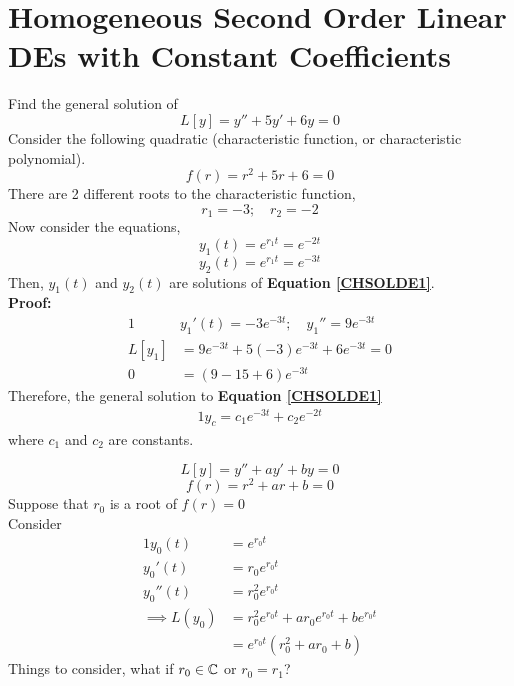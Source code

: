 \documentclass[diffeq.tex]{subfiles}
\begin{document}
\section{Homogeneous Second Order Linear DEs with Constant Coefficients}
\begin{example}[CHSOLDE]
    Find the general solution of
    \begin{equation}
        \label{CHSOLDE1}
        L[y] = y'' + 5y' + 6y = 0
    \end{equation}
    Consider the following quadratic (characteristic function, or characteristic polynomial).
    \begin{equation}
        f(r) = r^{2} + 5r + 6 = 0
    \end{equation}
    There are 2 different roots to the characteristic function,
    \begin{equation}
        r_{1} = -3;\quad r_{2} = -2
    \end{equation}
    Now consider the equations,
    \begin{equation}
        y_{1}(t) = e^{r_{1}t} = e^{-2t}
    \end{equation}
    \begin{equation}
        y_{2}(t) = e^{r_{1}t} = e^{-3t}
    \end{equation}
    Then, $y_{1}(t)$ and $y_{2}(t)$ are solutions of \textbf{Equation \ref{CHSOLDE1}}.\\
    \textbf{Proof:}
    \begin{alignat}{1}
        &y_{1}'(t) = -3e^{-3t};\quad y_{1}'' = 9e^{-3t}\\
        L[y_{1}] &= 9e^{-3t} + 5(-3)e^{-3t} + 6e^{-3t} = 0 \\
        0&= (9 - 15 + 6)e^{-3t}
    \end{alignat}
    Therefore, the general solution to \textbf{Equation \ref{CHSOLDE1}}
    \begin{alignat}{1}
        y_{c} = c_{1}e^{-3t} + c_{2}e^{-2t}
    \end{alignat}
    where $c_1$ and $c_2$ are constants.
\end{example}
\np
\begin{example}
    \begin{equation}
        L[y] = y'' + ay' + by = 0
    \end{equation}
    \begin{equation}
        f(r) = r^{2} + ar + b = 0
    \end{equation}
    Suppose that $r_{0}$ is a root of $f(r) = 0$\\
    Consider \begin{alignat}{1}
        y_{0}(t) &= e^{r_{0}t}\\
        y_{0}'(t) &= r_{0}e^{r_{0}t}\\
        y_{0}''(t) &= r_{0}^{2}e^{r_{0}t}\\
        \implies L(y_{0}) &= r_{0}^{2}e^{r_{0}t} + ar_{0}e^{r_{0}t} + be^{r_{0}t}\\
        &=e^{r_{0}t}(r_{0}^{2} + ar_{0} + b)
    \end{alignat}
    Things to consider, what if $r_{0} \in \mathbb{C}$ or $r_{0} = r_{1}$?
\end{example}
\end{document}
